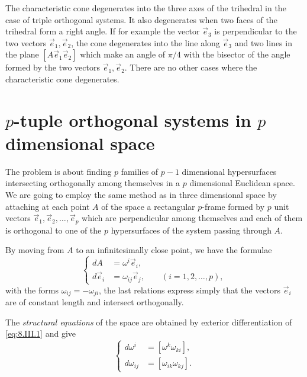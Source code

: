 \documentclass[leqno,11pt]{book}
\numberwithin{equation}{chapter}
\theoremstyle{shape1}
\theoremstyle{shape0}
\theoremstyle{shape2}
\theoremstyle{definition}
\begin{document}
The characteristic cone degenerates into the three axes of the trihedral in the case of triple orthogonal systems. It also degenerates when two faces of the trihedral form a right angle. If for example the vector $\vec e_{3}$ is perpendicular to the two vectors $\vec e_{1},\vec e_{2}$, the cone degenerates into the line along $\vec e_{3}$ and  two lines in the plane $[A\vec e_{1}\vec e_{2}]$ which make an angle of $\pi/4$ with the bisector of the angle formed by the two vectors $\vec e_{1},\vec e_{2}$. There are no other cases where the characteristic cone degenerates.



\section{$p$-tuple orthogonal systems in $p$ dimensional space}
\label{sec:p-tuple-orthogonal}

\fsec The problem is about finding $p$ families of $p-1$ dimensional hypersurfaces intersecting orthogonally among themselves in a $p$ dimensional Euclidean space. We are going to employ the same method as in three dimensional space by attaching at each point $A$ of the space a rectangular $p$-frame formed by $p$ unit vectors $\vec e_{1},\vec e_{2},\dots,\vec e_{p}$ which are perpendicular among themselves and each of them is orthogonal to one of the $p$ hypersurfaces  of the system passing through $A$.

By moving from $A$ to an infinitesimally close point, we have the formulae
\begin{equation}
  \label{eq:8.III.1}\tag{III, 1}
  \left\{
    \begin{aligned}
      dA&=\omega^{i}\vec e_{i},\\
      d\vec e_{i}&=\omega_{ij}\vec e_{j},\qquad(i=1,2,\dots,p),
    \end{aligned}
  \right.
\end{equation}
with the forms $\omega_{ij}=-\omega_{ji}$, the last relations express simply that the vectors $\vec e_{i}$ are of constant length and intersect orthogonally.

The \emph{structural equations} of the space are obtained by exterior differentiation of \eqref{eq:8.III.1} and give
\begin{equation}
  \label{eq:8.III.2}\tag{III, 2}
  \left\{
    \begin{aligned}
      d\omega^{i}&=[\omega^{k}\omega_{ki}],\\
      d\omega_{ij}&=[\omega_{ik}\omega_{kj}].
    \end{aligned}
  \right.
\end{equation}
\end{document}
